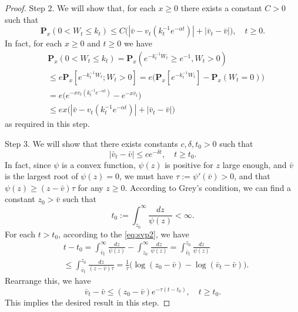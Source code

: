 \documentclass[12pt,a4paper]{amsart}
\theoremstyle{plain}
\theoremstyle{definition}
\numberwithin{equation}{section}
\begin{document}
\begin{proof}
    Step 2. We will show that, for each $x \geq 0$ there exists a constant $C>0$ such that
\[
    \mathbf P_{x}(0< W_t\leq k_t)
    \leq C\big(|\bar v- v_t(k_t^{-1}e^{-\alpha t})|+|\bar v_t - \bar v|\big),
    \quad t\geq 0.
\]
In fact, for each $x\geq 0$ and $t\geq 0$ we have
\begin{equation}\begin{split}
    &\mathbf P_{x}(0<W_t \leq k_t)
    = \mathbf P_{x}( e^{-k_t^{-1}W_t}\geq e^{-1},W_t > 0)
    \\&\leq e \mathbf P_{x}[e^{-k_t^{-1} W_t};W_t > 0]
    =  e\big(\mathbf P_x[e^{-k_t^{-1} W_t}]-\mathbf P_x(W_t = 0)\big)
    \\ &= e\big(e^{-xv_t(k_t^{-1} e^{-\alpha t})}-e^{-x\bar v_t}\big)
    \\&\leq ex \big(|\bar v-v_t(k_t^{-1} e^{-\alpha t})|+ |\bar v_t- \bar v|\big)
\end{split}\end{equation}
    as required in this step.

    Step 3. We will show that there exists constants $c, \delta, t_0 > 0$ such that 
\[
    |\bar v_t-\bar v| 
    \leq ce^{-\delta t}, 
    \quad t\geq t_0.
\]
    In fact, since $\psi$ is a convex function, $\psi(z)$ is positive for $z$ large enough, and $\bar v$ is the largest root of $\psi(z)=0$, we must have $\tau:=\psi'(\bar v)>0$, and that  $\psi(z) \geq (z-\bar v)\tau$ for any $z\geq 0$.
    According to Grey's condition, we can find a constant $z_0 >\bar v $ such that
\[
    t_0 
    := \int^\infty_{z_0} \frac{dz}{\psi(z)} < \infty.
\]
    For each $t > t_0$, according to the \eqref{eq:svp2}, we have
\begin{equation}\begin{split}
    &t-t_0 = \int^\infty_{\bar v_t} \frac{dz}{\psi(z)} - \int_{z_0}^\infty \frac{dz}{\psi(z)} 
    =\int_{\bar v_t}^{z_0} \frac{dz}{\psi(z)}
    \\ &\leq \int_{\bar v_t}^{z_0} \frac{dz}{(z-\bar v)\tau} 
    = \frac{1}{\tau} \big(\log (z_0-\bar v) - \log(\bar v_t-\bar v)\big).
\end{split}\end{equation}
    Rearrange this, we have
\[
    \bar v_t - \bar v \leq (z_0 - \bar v)e^{-\tau(t-t_0)},
    \quad t\geq t_0.
\] 
    This implies the desired result in this step.


\end{proof}
\end{document}
